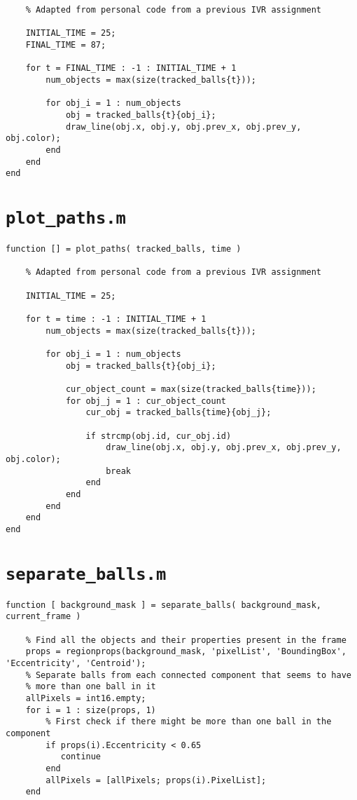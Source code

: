 \documentclass[12pt,a4paper]{article}
\begin{document}
\begin{appendices}
\begin{verbatim}
    % Adapted from personal code from a previous IVR assignment

    INITIAL_TIME = 25;
    FINAL_TIME = 87;

    for t = FINAL_TIME : -1 : INITIAL_TIME + 1
        num_objects = max(size(tracked_balls{t}));

        for obj_i = 1 : num_objects
            obj = tracked_balls{t}{obj_i};
            draw_line(obj.x, obj.y, obj.prev_x, obj.prev_y, obj.color); 
        end
    end
end
\end{verbatim}

\chapter{\texttt{plot\_paths.m}}
\begin{verbatim}
function [] = plot_paths( tracked_balls, time )

    % Adapted from personal code from a previous IVR assignment

    INITIAL_TIME = 25;

    for t = time : -1 : INITIAL_TIME + 1
        num_objects = max(size(tracked_balls{t}));

        for obj_i = 1 : num_objects
            obj = tracked_balls{t}{obj_i};
            
            cur_object_count = max(size(tracked_balls{time}));
            for obj_j = 1 : cur_object_count
                cur_obj = tracked_balls{time}{obj_j};

                if strcmp(obj.id, cur_obj.id)
                    draw_line(obj.x, obj.y, obj.prev_x, obj.prev_y, obj.color); 
                    break
                end
            end
        end
    end
end
\end{verbatim}

\chapter{\texttt{separate\_balls.m}}
\begin{verbatim}
function [ background_mask ] = separate_balls( background_mask, current_frame )
    
    % Find all the objects and their properties present in the frame
    props = regionprops(background_mask, 'pixelList', 'BoundingBox', 'Eccentricity', 'Centroid');
    % Separate balls from each connected component that seems to have
    % more than one ball in it
    allPixels = int16.empty;
    for i = 1 : size(props, 1)
        % First check if there might be more than one ball in the component
        if props(i).Eccentricity < 0.65
           continue
        end
        allPixels = [allPixels; props(i).PixelList];
    end
    

\end{verbatim}
\end{appendices}
\end{document}
